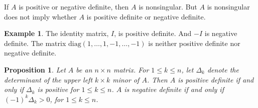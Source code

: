 \documentclass[12pt]{article}
\theoremstyle{plain}
\newtheorem*{prop}{Proposition}
\theoremstyle{definition}
\newtheorem*{eg}{Example}
\begin{document}
If $A$ is positive or negative definite, then $A$ is nonsingular.
But $A$ is nonsingular does not imply whether $A$ is positive definite or negative definite.

\begin{eg}
    The identity matrix, $I$, is positive definite.
    And $-I$ is negative definite.
    The matrix $\text{diag}(1,\ldots,1,-1,\ldots,-1)$ is neither positive definite nor negative definite.
\end{eg}

\begin{prop}
    Let $A$ be an $n\times n$ matrix.
    For $1\leq k\leq n$, let $\Delta_k$ denote the determinant of the upper left $k\times k$ minor of $A$.
    Then $A$ is positive definite if and only if $\Delta_k$ is positive for $1\leq k\leq n$.
    $A$ is negative definite if and only if $(-1)^k\Delta_k > 0$, for $1\leq k\leq n$.
\end{prop}
\end{document}
